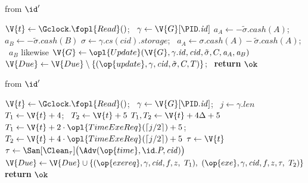 \begin{interface}
{ \quad from $\id'$
\begin{algorithmic}[1]
\algcont
\State $\V{t} \gets \Gclock.\fopl{Read}()$; \ $\gamma \gets \V{G}[\PID.\mathit{id}]$
  \State $\mathit{a}_A \gets -\tilde{\sigma}.\mathit{cash}(A)$; \ $\mathit{a}_B \gets -\tilde{\sigma}.\mathit{cash}(B)$
    \State $\sigma \gets \gamma.\mathit{cs}(\mathit{cid}).\mathit{storage}$; \ $\mathit{a}_A \gets \sigma.\mathit{cash}(A) - \tilde{\sigma}.\mathit{cash}(A)$; \ $\mathit{a}_B$ likewise
  \EndIf
  \State $\V{G} \gets \opl{Update}(\V{G}, \gamma.\mathit{id}, \mathit{cid}, \tilde{\sigma}, C, \mathit{a}_A, \mathit{a}_B)$ \label{ln:chanapply}
\EndIf
\State $\V{Due} \gets \V{Due} \setminus \{(\op{update}, \gamma, \mathit{cid}, \tilde{\sigma}, C, T)\}$; \ \textbf{return} $\ok$ \label{ln:chansilent}
\algsave
\end{algorithmic}
\vspace{1.4ex}

 \quad from $\id'$
\begin{algorithmic}[1]
\algcont
\State $\V{t} \gets \Gclock.\fopl{Read}()$; \ $\gamma \gets \V{G}[\PID.\mathit{id}]$; \ $j \gets \gamma.\mathit{len}$
\State $T_1 \gets \V{t} + 4$; \ $T_2 \gets \V{t} + 5$ \label{ln:chanexeopt}
  \State $T_1, T_2 \gets \V{t} + 4\Delta + 5$
\EndIf
{}
  \State $T_1 \gets \V{t} + 2 \cdot \opl{TimeExeReq}(\lceil j/2 \rceil) + 5$; \ $T_2 \gets \V{t} + 4 \cdot \opl{TimeExeReq}(\lceil j/2 \rceil) + 5$
\EndIf
\State $\tau \gets \V{t}$
  \State $\tau \gets \San[\Clean_{\tau}]\bigl(\Adv(\op{time}, \id.P, \mathit{cid})\bigr)$ \label{ln:chanadvtime}
\EndIf
\State $\V{Due} \gets \V{Due} \cup \{(\op{exereq}, \gamma, \mathit{cid}, f, z, \ T_1), \ (\op{exe}, \gamma, \mathit{cid}, f, z, \tau, \ T_2)\}$
\State \textbf{return} $\ok$
\algsave
\end{algorithmic}
\vspace{1.4ex}

}
\end{interface}
